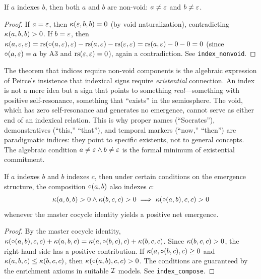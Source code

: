 \begin{theorem}
\label{thm:index-nonvoid}
If $a$ indexes $b$, then both $a$ and $b$ are non-void: $a \neq \varepsilon$ and $b \neq \varepsilon$.
\end{theorem}

\begin{proof}
If $a = \varepsilon$, then $\kappa(\varepsilon, b, b) = 0$ (by void naturalization), contradicting $\kappa(a, b, b) > 0$. If $b = \varepsilon$, then $\kappa(a, \varepsilon, \varepsilon) = \mathrm{rs}(\circ(a, \varepsilon), \varepsilon) - \mathrm{rs}(a, \varepsilon) - \mathrm{rs}(\varepsilon, \varepsilon) = \mathrm{rs}(a, \varepsilon) - 0 - 0 = 0$ (since $\circ(a, \varepsilon) = a$ by A3 and $\mathrm{rs}(\varepsilon, \varepsilon) = 0$), again a contradiction. See \texttt{index\_nonvoid}.
\end{proof}

\begin{remark}
The theorem that indices require non-void components is the algebraic expression of Peirce's insistence that indexical signs require \emph{existential} connection. An index is not a mere idea but a sign that points to something \emph{real}---something with positive self-resonance, something that ``exists'' in the semiosphere. The void, which has zero self-resonance and generates no emergence, cannot serve as either end of an indexical relation. This is why proper names (``Socrates''), demonstratives (``this,'' ``that''), and temporal markers (``now,'' ``then'') are paradigmatic indices: they point to specific existents, not to general concepts. The algebraic condition $a \neq \varepsilon \wedge b \neq \varepsilon$ is the formal minimum of existential commitment.
\end{remark}

\begin{theorem}
\label{thm:index-compose}
If $a$ indexes $b$ and $b$ indexes $c$, then under certain conditions on the emergence structure, the composition $\circ(a, b)$ also indexes $c$:
\[
  \kappa(a, b, b) > 0 \wedge \kappa(b, c, c) > 0 \implies \kappa(\circ(a, b), c, c) > 0
\]
whenever the master cocycle identity yields a positive net emergence.
\end{theorem}

\begin{proof}
By the master cocycle identity, $\kappa(\circ(a, b), c, c) + \kappa(a, b, c) = \kappa(a, \circ(b, c), c) + \kappa(b, c, c)$. Since $\kappa(b, c, c) > 0$, the right-hand side has a positive contribution. If $\kappa(a, \circ(b, c), c) \geq 0$ and $\kappa(a, b, c) \leq \kappa(b, c, c)$, then $\kappa(\circ(a, b), c, c) > 0$. The conditions are guaranteed by the enrichment axioms in suitable $\mathcal{I}$ models. See \texttt{index\_compose}.
\end{proof}

